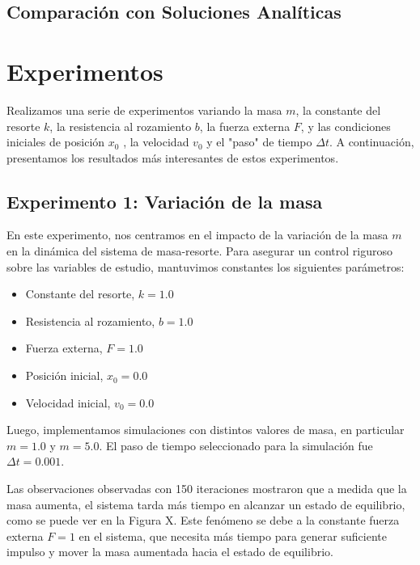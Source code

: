 \documentclass{article}
\begin{document}
\subsection{Comparación con Soluciones Analíticas}


\section{Experimentos}
Realizamos una serie de experimentos variando la masa $m$, la constante del resorte $k$, la resistencia al rozamiento $b$, la fuerza externa $F$, y las condiciones iniciales de posición $x_0$ , la velocidad $v_0$ y el "paso" de tiempo $\Delta t$. A continuación, presentamos los resultados más interesantes de estos experimentos.

\subsection{Experimento 1: Variación de la masa}
En este experimento, nos centramos en el impacto de la variación de la masa $m$ en la dinámica del sistema de masa-resorte. Para asegurar un control riguroso sobre las variables de estudio, mantuvimos constantes los siguientes parámetros:

\begin{itemize}
\item Constante del resorte, $k = 1.0$
\item Resistencia al rozamiento, $b = 1.0$
\item Fuerza externa, $F = 1.0$
\item Posición inicial, $x_0 = 0.0$
\item Velocidad inicial, $v_0 = 0.0$
\end{itemize}

Luego, implementamos simulaciones con distintos valores de masa, en particular $m = 1.0$ y $m = 5.0$. El paso de tiempo seleccionado para la simulación fue $\Delta t= 0.001$.

Las observaciones observadas con 150 iteraciones mostraron que a medida que la masa aumenta, el sistema tarda más tiempo en alcanzar un estado de equilibrio, como se puede ver en la Figura X. Este fenómeno se debe a la constante fuerza externa $F = 1$ en el sistema, que necesita más tiempo para generar suficiente impulso y mover la masa aumentada hacia el estado de equilibrio.
\end{document}
